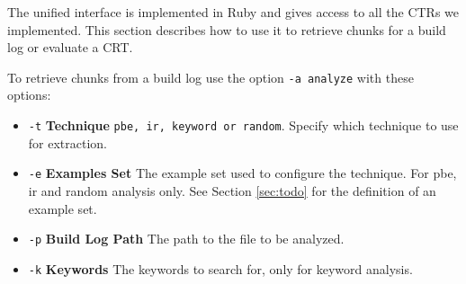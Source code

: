 \documentclass[\myrootdir/main.tex]{subfiles}
\begin{document}


The unified interface is implemented in Ruby and gives access to all the CTRs we implemented.
This section describes how to use it to retrieve chunks for a build log or evaluate a CRT.

To retrieve chunks from a build log use the option \texttt{-a analyze} with these options:
\begin{itemize}
    \item \texttt{-t} \textbf{Technique} \texttt{pbe, ir, keyword or random}. Specify which technique to use for extraction.
    \item \texttt{-e} \textbf{Examples Set} The example set used to configure the technique. For pbe, ir and random analysis only. See Section \ref{sec:todo} for the definition of an example set.
    \item \texttt{-p} \textbf{Build Log Path} The path to the file to be analyzed.
    \item \texttt{-k} \textbf{Keywords} The keywords to search for, only for keyword analysis.
\end{itemize}
\end{document}
